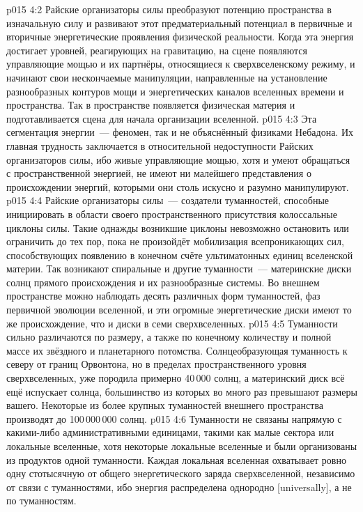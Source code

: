 \vs p015 4:2 Райские организаторы силы преобразуют потенцию пространства в изначальную силу и развивают этот предматериальный потенциал в первичные и вторичные энергетические проявления физической реальности. Когда эта энергия достигает уровней, реагирующих на гравитацию, на сцене появляются управляющие мощью и их партнёры, относящиеся к сверхвселенскому режиму, и начинают свои нескончаемые манипуляции, направленные на установление разнообразных контуров мощи и энергетических каналов вселенных времени и пространства. Так в пространстве появляется физическая материя и подготавливается сцена для начала организации вселенной.
\vs p015 4:3 Эта сегментация энергии~--- феномен, так и не объяснённый физиками Небадона. Их главная трудность заключается в относительной недоступности Райских организаторов силы, ибо живые управляющие мощью, хотя и умеют обращаться с пространственной энергией, не имеют ни малейшего представления о происхождении энергий, которыми они столь искусно и разумно манипулируют.
\vs p015 4:4 \pc Райские организаторы силы~--- создатели туманностей, способные инициировать в области своего пространственного присутствия колоссальные циклоны силы. Такие однажды возникшие циклоны невозможно остановить или ограничить до тех пор, пока не произойдёт мобилизация всепроникающих сил, способствующих появлению в конечном счёте ультиматонных единиц вселенской материи. Так возникают спиральные и другие туманности~--- материнские диски солнц прямого происхождения и их разнообразные системы. Во внешнем пространстве можно наблюдать десять различных форм туманностей, фаз первичной эволюции вселенной, и эти огромные энергетические диски имеют то же происхождение, что и диски в семи сверхвселенных.
\vs p015 4:5 \pc Туманности сильно различаются по размеру, а также по конечному количеству и полной массе их звёздного и планетарного потомства. Солнцеобразующая туманность к северу от границ Орвонтона, но в пределах пространственного уровня сверхвселенных, уже породила примерно 40\,000 солнц, а материнский диск всё ещё испускает солнца, большинство из которых во много раз превышают размеры вашего. Некоторые из более крупных туманностей внешнего пространства производят до 100\,000\,000 солнц.
\vs p015 4:6 Туманности не связаны напрямую с какими\hyp{}либо административными единицами, такими как малые сектора или локальные вселенные, хотя некоторые локальные вселенные и были организованы из продуктов одной туманности. Каждая локальная вселенная охватывает ровно одну стотысячную от общего энергетического заряда сверхвселенной, независимо от связи с туманностями, ибо энергия распределена однородно [universally], а не по туманностям.
